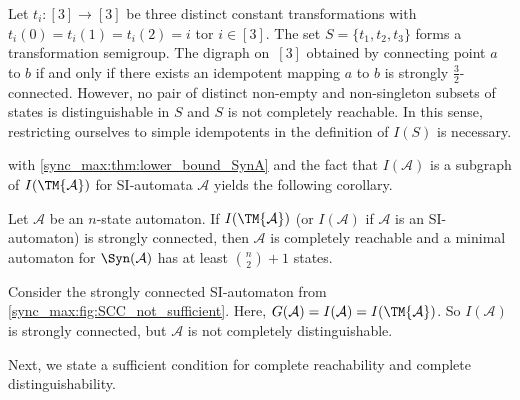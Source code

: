 \begin{example}
	Let $t_i : [3] \to [3]$ be three distinct constant transformations
	with $t_i(0) = t_i(1) = t_i(2) = i$
	tor $i \in [3]$. The set $S = \{ t_1, t_2, t_3 \}$ forms a transformation semigroup.
	The digraph on~$[3]$ obtained by connecting point $a$ to $b$
	if and only if there exists an idempotent mapping $a$ to $b$
	is strongly $\frac{3}{2}$-connected.
	However, no pair of distinct non-empty and non-singleton 
	subsets of states is distinguishable 
	in  $S$ and $S$ is not completely reachable.
	In this sense, restricting ourselves to simple idempotents in the definition of $I(S)$
	is necessary.			
\end{example}

 with \cref{sync_max:thm:lower_bound_SynA}
and the fact that $I(\mathcal A)$
is a subgraph of $I(\TM{\mathcal A})$ for SI-automata $\mathcal A$
yields the following corollary.

\begin{corollary}
\label{cor:IA_SCC_implies_CR}
	Let $\mathcal A$ be an $n$-state automaton.
	If $I(\TM{\mathcal A})$ (or $I(\mathcal A)$ if $\mathcal A$ is an SI-automaton) is strongly connected,
	then $\mathcal A$ is completely reachable and a minimal automaton
	for $\Syn(\mathcal A)$ has at least $\binom{n}{2} + 1$ states.
\end{corollary}

\begin{example}
Consider the strongly connected SI-automaton from \cref{sync_max:fig:SCC_not_sufficient}. 
Here, $G(\mathcal A) = I(\mathcal A) = I(\TM{\mathcal A})$.
So $I(\mathcal A)$ is strongly connected, but $\mathcal A$
is not completely distinguishable.		
\end{example}

Next, we state a sufficient condition for complete reachability
and complete distinguishability.


